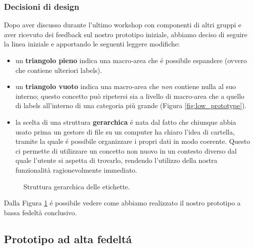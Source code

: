 \documentclass[12pt]{article} %
\begin{document}
\subsubsection{Decisioni di design}
Dopo aver discusso durante l'ultimo workshop con componenti di altri gruppi e aver ricevuto dei feedback sul nostro prototipo iniziale, abbiamo deciso di seguire la linea iniziale e apportando le seguenti leggere modifiche:
\begin{itemize}
\item un \textbf{triangolo pieno} indica una macro-area che \'e possibile espandere (ovvero che contiene ulteriori labels).
\item un \textbf{triangolo vuoto} indica una macro-area che \emph{non} contiene nulla al suo interno; questo concetto pu\`o ripetersi sia a livello di macro-area che a quello di labels all'interno di una categoria pi\`u grande (Figura \ref{fig:low_prototype}).
\item la scelta di una struttura \textbf{gerarchica} \'e nata dal fatto che chiunque abbia usato prima un gestore di file su un computer ha chiaro l'idea di cartella, tramite la quale \'e possibile organizzare i propri dati in modo coerente. Questo ci permette di utilizzare un concetto non nuovo in un contesto diverso dal 	quale l'utente si aspetta di trovarlo, rendendo l'utilizzo della nostra funzionalit\`a ragionevolmente immediato.
\end{itemize}

\begin{figure}[H] 
\caption{Struttura gerarchica delle etichette.}
\label{fig:low_prototype2}
\end{figure}

Dalla Figura \ref{fig:low_prototype2} \'e possibile vedere come abbiamo realizzato il nostro prototipo a bassa fedelt\`a conclusivo.

\subsection{Prototipo ad alta fedelt\'a}
\end{document}

